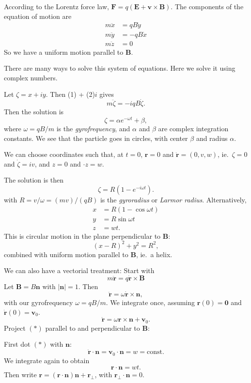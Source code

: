\documentclass[a4paper]{article}
\begin{document}
According to the Lorentz force law, $\mathbf{F} = q(\mathbf{E} + \mathbf{v}\times \mathbf{B})$. The components of the equation of motion are
\begin{align*}
  m\ddot{x} &= qB\dot{y}\tag{1}\\
  m\ddot{y} &= -qB\dot{x}\tag{2}\\
  m\ddot{z} &= 0
\end{align*}
So we have a uniform motion parallel to $\mathbf{B}$.

There are many ways to solve this system of equations. Here we solve it using complex numbers.

Let $\zeta = x + iy$. Then (1) + (2)$i$ gives
\[
  m\ddot{\zeta} = -iqB\dot{\zeta}.
\]
Then the solution is
\[
  \zeta = \alpha e^{-\omega t} + \beta,
\]
where $\omega = qB/m$ is the \emph{gyrofrequency}, and $\alpha$ and $\beta$ are complex integration constants. We see that the particle goes in circles, with center $\beta$ and radius $\alpha$.

We can choose coordinates such that, at $t = 0$, $\mathbf{r} = 0$ and $\dot{\mathbf{r}} = (0, v, w)$, ie.~$\zeta = 0$ and $\dot{\zeta} = iv$, and $z = 0$ and $\cdot z = w$.

The solution is then
\[
  \zeta = R(1 - e^{-i\omega t}).
\]
with $R = v/\omega = (mv)/(qB)$ is the \emph{gyroradius} or \emph{Larmor radius}. Alternatively,
\begin{align*}
  x &= R(1 - \cos \omega t)\\
  y &= R\sin \omega t\\
  z &= wt.
\end{align*}
This is circular motion in the plane perpendicular to $\mathbf{B}$:
\[
  (x - R)^2 + y^2 = R^2,
\]
combined with uniform motion parallel to $\mathbf{B}$, ie.~a helix.

We can also have a vectorial treatment: Start with
\[
  m\ddot{\mathbf{r}} = q\dot{\mathbf{r}}\times \mathbf{B}
\]
Let $\mathbf{B} = B\mathbf{n}$ with $|\mathbf{n}| = 1$. Then
\[
  \ddot{\mathbf{r}} = \omega \dot{\mathbf{r}}\times \mathbf{n},
\]
with our gyrofrequency $\omega = qB/m$. We integrate once, assuming $\mathbf{r}(0) = \mathbf{0}$ and $\dot{\mathbf{r}}(0) = \mathbf{v}_0$.
\[
  \dot{\mathbf{r}} = \omega \mathbf{r} \times \mathbf{n} + \mathbf{v}_0. \tag{$*$}
\]
Project $(*)$ parallel to and perpendicular to $\mathbf{B}$:

First dot $(*)$ with $\mathbf{n}$:
\[
  \dot{\mathbf{r}}\cdot \mathbf{n} = \mathbf{v}_0\cdot \mathbf{n} = w = \text{const}.
\]
We integrate again to obtain
\[
  \mathbf{r}\cdot \mathbf{n} = wt.
\]
Then write $\mathbf{r} = (\mathbf{r}\cdot \mathbf{n})\mathbf{n} + \mathbf{r}_\bot$, with $\mathbf{r}_\bot \cdot \mathbf{n} = 0$.
\end{document}
